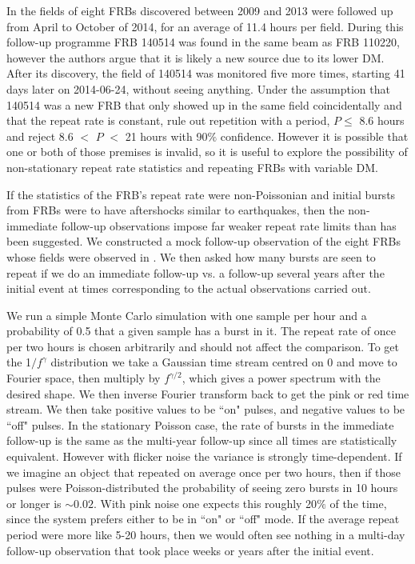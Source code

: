 \documentclass[useAMS,usenatbib]{mn2e}
\begin{document}
In \cite{2015MNRAS.454..457P}
the fields of eight FRBs discovered between 2009 and 2013
were followed up from April to October of 2014, for an average 
of 11.4 hours per field. During this follow-up programme 
FRB 140514 was found in the same beam as FRB 110220, however
the authors argue that it is likely a new source due to its lower DM. 
After its discovery, the field of 140514 was monitored 
five more times, starting 41 days later on 2014-06-24, without seeing anything.
Under the assumption that 140514 was a new FRB 
that only showed up in the same field 
coincidentally and that the repeat rate is constant,
 \cite{2015MNRAS.454..457P} rule out repetition with a period, $P \le$ 8.6 
hours and reject 8.6 $<$ $P$ $<$ 21 hours with 90$\%$ confidence.
However it is possible that one or both of those premises 
is invalid, so it is useful to explore the possibility of non-stationary 
repeat rate statistics and repeating FRBs with variable DM. 

If the statistics of the FRB's repeat rate were
non-Poissonian and initial bursts from FRBs were to have aftershocks
similar to earthquakes, then the non-immediate follow-up observations 
impose far weaker repeat rate limits than has been suggested. We 
constructed a mock follow-up observation of the eight FRBs whose
fields were observed in \cite{2015MNRAS.454..457P}. We then 
asked how many bursts are seen to repeat if we do an immediate
follow-up vs. a follow-up several years after the initial event 
at times corresponding 
to the actual observations carried out. 

We run a simple Monte Carlo 
simulation with one sample per hour and a probability of 0.5 
that a given sample has a burst in it. The repeat rate of once per two hours
is chosen arbitrarily and should not affect the comparison. To get the 
1$/f^{\gamma}$ distribution we
take a Gaussian time stream centred on 0 and move to Fourier space, then 
multiply by $f^{\gamma / 2}$, which gives a power spectrum with the desired shape. 
We then inverse Fourier transform back to get the pink or red time stream.
We then take positive values to be ``on" pulses, and negative values to be ``off" pulses. 
In the stationary Poisson case, the rate of bursts in 
the immediate follow-up is the same as the multi-year follow-up 
since all times are 
statistically equivalent. However with flicker noise 
the variance is strongly time-dependent. If we imagine an object that 
repeated on average once per two hours, then if those pulses were Poisson-distributed 
the probability of seeing zero bursts in 10 hours or longer is $\sim0.02$. With 
pink noise one expects this roughly 20$\%$ of the time, since the system 
prefers either to be in ``on" or ``off" mode. If the average repeat period were more 
like 5-20 hours, then we would often see nothing in a multi-day follow-up 
observation that took place weeks or years after the initial event.
\end{document}
